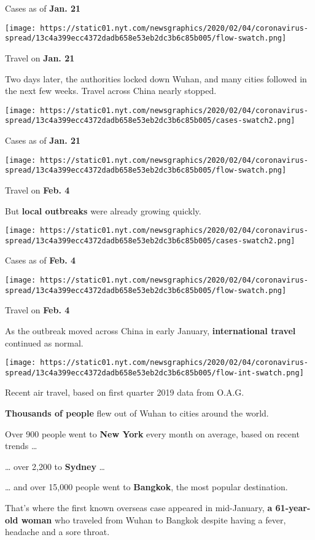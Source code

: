 Cases as of \textbf{Jan. 21}

\texttt{[image: https://static01.nyt.com/newsgraphics/2020/02/04/coronavirus-spread/13c4a399ecc4372dadb658e53eb2dc3b6c85b005/flow-swatch.png]}

Travel on \textbf{Jan. 21}

Two days later, the authorities locked down Wuhan, and many cities
followed in the next few weeks. Travel across China nearly stopped.

\texttt{[image: https://static01.nyt.com/newsgraphics/2020/02/04/coronavirus-spread/13c4a399ecc4372dadb658e53eb2dc3b6c85b005/cases-swatch2.png]}

Cases as of \textbf{Jan. 21}

\texttt{[image: https://static01.nyt.com/newsgraphics/2020/02/04/coronavirus-spread/13c4a399ecc4372dadb658e53eb2dc3b6c85b005/flow-swatch.png]}

Travel on \textbf{Feb. 4}

But \textbf{local outbreaks} were already growing quickly.

\texttt{[image: https://static01.nyt.com/newsgraphics/2020/02/04/coronavirus-spread/13c4a399ecc4372dadb658e53eb2dc3b6c85b005/cases-swatch2.png]}

Cases as of \textbf{Feb. 4}

\texttt{[image: https://static01.nyt.com/newsgraphics/2020/02/04/coronavirus-spread/13c4a399ecc4372dadb658e53eb2dc3b6c85b005/flow-swatch.png]}

Travel on \textbf{Feb. 4}

As the outbreak moved across China in early January,
\textbf{international travel} continued as normal.

\texttt{[image: https://static01.nyt.com/newsgraphics/2020/02/04/coronavirus-spread/13c4a399ecc4372dadb658e53eb2dc3b6c85b005/flow-int-swatch.png]}

Recent air travel, based on first quarter 2019 data from O.A.G.

\textbf{Thousands of people} flew out of Wuhan to cities around the
world.

Over 900 people went to \textbf{New York} every month on average, based
on recent trends \ldots{}

\ldots{} over 2,200 to \textbf{Sydney} \ldots{}

\ldots{} and over 15,000 people went to \textbf{Bangkok}, the most
popular destination.

That's where the first known overseas case appeared in mid-January,
\textbf{a 61-year-old woman} who traveled from Wuhan to Bangkok despite
having a fever, headache and a sore throat.

